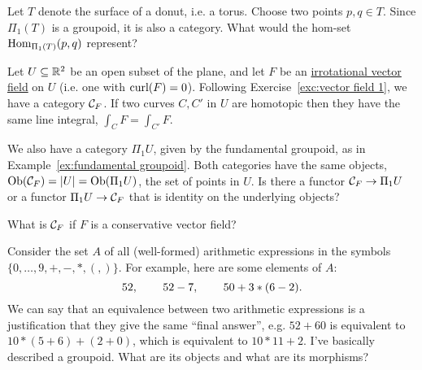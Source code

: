 \documentclass[CT4S-EN-RU]{subfiles}
\begin{document}
\begin{exampleRUS}\label{ex:fundamental groupoid}
\end{exampleRUS}

\begin{exerciseENG}
Let $T$ denote the surface of a donut, i.e. a torus. Choose two points $p,q\in T$. Since $\Pi_1(T)$ is a groupoid, it is also a category. What would the hom-set $\textnormal{Hom}_{\Pi_1(T)}(p,q)$ represent?
\end{exerciseENG}

\begin{exerciseRUS}
\end{exerciseRUS}

\begin{exerciseENG}
Let $U\subseteq{\mathbb R}^2$ be an open subset of the plane, and let $F$ be an \href{http://en.wikipedia.org/wiki/Conservative_vector_field#Irrotational_vector_fields}{\text irrotational vector field} on $U$ (i.e. one with $\textnormal{curl}(F)=0$). Following Exercise~\ref{exc:vector field 1}, we have a category $\mathcal{C}_F$. If two curves $C,C'$ in $U$ are homotopic then they have the same line integral, $\int_CF=\int_{C'}F$.

We also have a category $\Pi_1U$, given by the fundamental groupoid, as in Example~\ref{ex:fundamental groupoid}. Both categories have the same objects, $\textnormal{Ob}(\mathcal{C}_F)=|U|=\textnormal{Ob}(\Pi_1U)$, the set of points in $U$.
\sexc Is there a functor $\mathcal{C}_F\rightarrow\Pi_1U$ or a functor $\Pi_1U\rightarrow\mathcal{C}_F$ that is identity on the underlying objects? 
\item What is $\mathcal{C}_F$ if $F$ is a conservative vector field?
\endsexc
\end{exerciseENG}

\begin{exerciseRUS}
\end{exerciseRUS}

\begin{exerciseENG}
Consider the set $A$ of all (well-formed) arithmetic expressions in the symbols $\{0,\ldots,9,+,-,*,(,)\}$. For example, here are some elements of $A$: $$52,\hspace{.3in} 52-7,\hspace{.3in} 50+3*(6-2).$$ We can say that an equivalence between two arithmetic expressions is a justification that they give the same “final answer”, e.g. $52+60$ is equivalent to $10*(5+6)+(2+0)$, which is equivalent to $10*11+2$. I've basically described a groupoid. What are its objects and what are its morphisms?
\end{exerciseENG}
\end{document}
